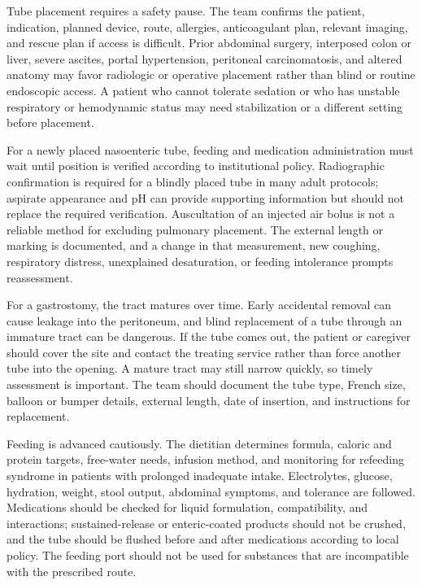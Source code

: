 Tube placement requires a safety pause. The team confirms the patient, indication, planned device, route, allergies, anticoagulant plan, relevant imaging, and rescue plan if access is difficult. Prior abdominal surgery, interposed colon or liver, severe ascites, portal hypertension, peritoneal carcinomatosis, and altered anatomy may favor radiologic or operative placement rather than blind or routine endoscopic access. A patient who cannot tolerate sedation or who has unstable respiratory or hemodynamic status may need stabilization or a different setting before placement.

For a newly placed nasoenteric tube, feeding and medication administration must wait until position is verified according to institutional policy. Radiographic confirmation is required for a blindly placed tube in many adult protocols; aspirate appearance and pH can provide supporting information but should not replace the required verification. Auscultation of an injected air bolus is not a reliable method for excluding pulmonary placement. The external length or marking is documented, and a change in that measurement, new coughing, respiratory distress, unexplained desaturation, or feeding intolerance prompts reassessment.

For a gastrostomy, the tract matures over time. Early accidental removal can cause leakage into the peritoneum, and blind replacement of a tube through an immature tract can be dangerous. If the tube comes out, the patient or caregiver should cover the site and contact the treating service rather than force another tube into the opening. A mature tract may still narrow quickly, so timely assessment is important. The team should document the tube type, French size, balloon or bumper details, external length, date of insertion, and instructions for replacement.

Feeding is advanced cautiously. The dietitian determines formula, caloric and protein targets, free-water needs, infusion method, and monitoring for refeeding syndrome in patients with prolonged inadequate intake. Electrolytes, glucose, hydration, weight, stool output, abdominal symptoms, and tolerance are followed. Medications should be checked for liquid formulation, compatibility, and interactions; sustained-release or enteric-coated products should not be crushed, and the tube should be flushed before and after medications according to local policy. The feeding port should not be used for substances that are incompatible with the prescribed route.

